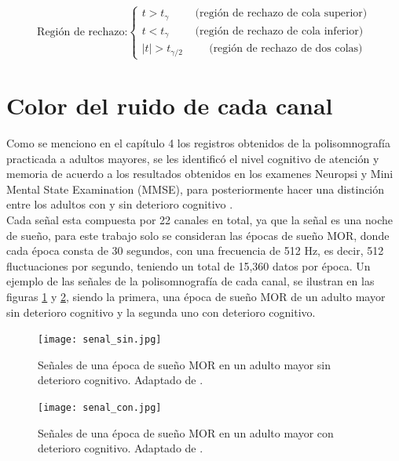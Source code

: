 \documentclass[letterpaper,titlepage,12pt,draft]{report}
\begin{document}
\[\text{Regi\'on de rechazo:}
 \left \{
   \begin{array}{rcl}
      t>t_\gamma \hspace{1cm} \text{(regi\'on de rechazo de cola superior)}\\
      t<t_\gamma \hspace{1cm} \text{(regi\'on de rechazo de cola inferior)}\\
|t|>t_{\gamma/2} \hspace{1cm} \text{(regi\'on de rechazo de dos colas)}
   \end{array}
\right. \]

\cite{Est}

\section{Color del ruido de cada canal}

Como se menciono en el cap\'itulo 4 los registros obtenidos de la polisomnograf\'ia practicada a 
adultos mayores, se les identific\'o el nivel cognitivo de atenci\'on y memoria de acuerdo a los 
resultados obtenidos en los examenes Neuropsi y Mini Mental State Examination (MMSE),  para 
posteriormente hacer una distinci\'on entre los adultos con y sin deterioro cognitivo \cite{Genesis}.\\

Cada señal esta compuesta por 22 canales en total, ya que la se\~nal es una noche de sue\~no, para 
este trabajo solo se consideran las \'epocas de sue\~no MOR, donde cada \'epoca consta de 30 
segundos, con una frecuencia de 512 Hz, es decir, 512 fluctuaciones por segundo, teniendo un total de 
15,360 datos por \'epoca. Un ejemplo de las se\~nales de la polisomnograf\'ia de cada canal, se 
ilustran en las figuras \ref{fig:reg_sano} y \ref{fig:reg_dc}, siendo la primera, una \'epoca de 
sue\~no MOR de un adulto mayor sin deterioro cognitivo y la segunda uno con deterioro cognitivo. 

\begin{figure}[H]
\centering
\texttt{[image: senal\_sin.jpg]}
\caption{Señales de una \'epoca de sue\~no MOR en un adulto mayor sin deterioro cognitivo. Adaptado de \cite{Genesis}.}
\label{fig:reg_sano}
\end{figure}

\begin{figure}[H]
\centering
\texttt{[image: senal\_con.jpg]}
\caption{Señales de una \'epoca de sue\~no MOR en un adulto mayor con deterioro cognitivo. Adaptado de \cite{Genesis}.}
\label{fig:reg_dc}
\end{figure}
\end{document}
